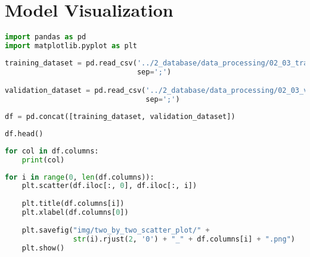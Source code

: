 
\label{ape:model_visualization}
\hypertarget{model-visualization}{%
\section{Model Visualization}\label{model-visualization}}

\begin{lstlisting}[language=Python]
import pandas as pd
import matplotlib.pyplot as plt
\end{lstlisting}

\begin{lstlisting}[language=Python]
training_dataset = pd.read_csv('../2_database/data_processing/02_03_training_dataset.csv',
                               sep=';')

validation_dataset = pd.read_csv('../2_database/data_processing/02_03_validation_dataset.csv',
                                 sep=';')
\end{lstlisting}

\begin{lstlisting}[language=Python]
df = pd.concat([training_dataset, validation_dataset])
\end{lstlisting}

\begin{lstlisting}[language=Python]
df.head()
\end{lstlisting}

\begin{lstlisting}[language=Python]
for col in df.columns:
    print(col)
\end{lstlisting}

\begin{lstlisting}[language=Python]
for i in range(0, len(df.columns)):
    plt.scatter(df.iloc[:, 0], df.iloc[:, i])
    
    plt.title(df.columns[i])
    plt.xlabel(df.columns[0])
    
    plt.savefig("img/two_by_two_scatter_plot/" + 
                str(i).rjust(2, '0') + "_" + df.columns[i] + ".png")
    plt.show()
\end{lstlisting}

